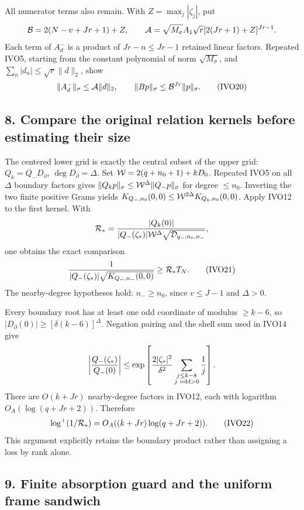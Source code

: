 \documentclass[11pt]{article}
\begin{document}
All numerator terms also remain. With \(Z=\max_j|\zeta_j|\), put \[
{\cal B}=2(N-v+Jr+1)+Z,\qquad
{\cal A}=\sqrt{M_\sigma}A_1\sqrt r[2(Jr+1)+Z]^{Jr-1}.
\] Each term of \(A_d^-\) is a product of \(Jr-n\le Jr-1\) retained linear factors. Repeated IVO5, starting from the constant polynomial of norm \(\sqrt{M_\sigma}\), and \(\sum_n|d_n|\le\sqrt r\|d\|_2\), show \[
\|A_d^-\|_\sigma\le{\cal A}\|d\|_2,\qquad
\|Bp\|_\sigma\le{\cal B}^{Jr}\|p\|_\sigma.
\tag{IVO20}
\]

\subsection{8. Compare the original relation kernels before estimating their size}\label{compare-the-original-relation-kernels-before-estimating-their-size}

The centered lower grid is exactly the central subset of the upper grid: \(Q_k=Q_-D_\partial\), \(\deg D_\partial=\Delta\). Set \({\cal W}=2(q+n_0+1)+kD_0\). Repeated IVO5 on all \(\Delta\) boundary factors gives \(\|Q_kp\|_\sigma\le{\cal W}^{\Delta}\|Q_-p\|_\sigma\) for degree \(\le n_0\). Inverting the two finite positive Grams yields \(K_{Q_-,n_0}(0,0)\le{\cal W}^{2\Delta}K_{Q_k,n_0}(0,0)\). Apply IVO12 to the first kernel. With \[
{\cal R}_*=
\frac{|Q_k(0)|}
{|Q_-(\zeta_*)|{\cal W}^{\Delta}
\sqrt{{\cal D}_{q_-;n_0,n_-}}},
\] one obtains the exact comparison \[
\frac1{|Q_-(\zeta_*)|\sqrt{K_{Q_-,n_-}(0,0)}}
\ge{\cal R}_*T_N.
\tag{IVO21}
\] The nearby-degree hypotheses hold: \(n_-\ge n_0\), since \(v\le J-1\) and \(\Delta>0\).

Every boundary root has at least one odd coordinate of modulus \(\ge k-6\), so \(|D_\partial(0)|\ge[\delta(k-6)]^\Delta\). Negation pairing and the shell sum used in IVO14 give \[
\left|\frac{Q_-(\zeta_*)}{Q_-(0)}\right|
\le\exp\left[\frac{2|\zeta_*|^2}{\delta^2}
\sum_{\substack{j\le k-8\\j\ {\rm odd}>0}}\frac1j\right].
\] There are \(O(k+Jr)\) nearby-degree factors in IVO12, each with logarithm \(O_A(\log(q+Jr+2))\). Therefore \[
\log^+(1/{\cal R}_*)=O_A((k+Jr)\log(q+Jr+2)).
\tag{IVO22}
\] This argument explicitly retains the boundary product rather than assigning a loss by rank alone.

\subsection{9. Finite absorption guard and the uniform frame sandwich}\label{finite-absorption-guard-and-the-uniform-frame-sandwich}
\end{document}

